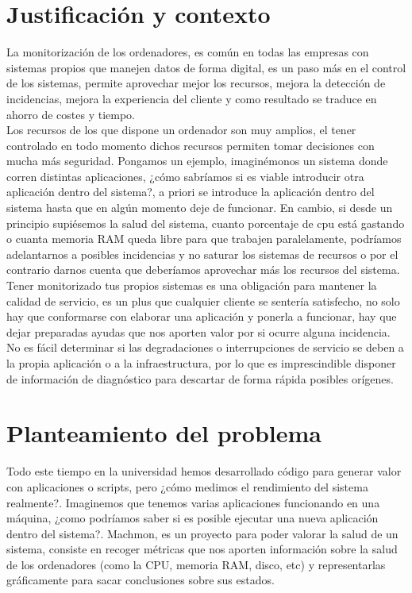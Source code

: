 \documentclass[ spanish, a4paper, 12pt, oneside]{report}
\begin{document}
\section{Justificación y contexto}


La monitorización de los ordenadores, es común en todas las empresas con sistemas propios que manejen datos de forma 
digital, es un paso más en el control de los sistemas, permite aprovechar mejor los recursos, mejora la detección de incidencias, mejora la experiencia del 
cliente y como resultado se traduce en ahorro de costes y tiempo. \\

Los recursos de los que dispone un ordenador son muy amplios, el tener controlado en todo momento dichos recursos permiten tomar decisiones
con mucha más seguridad. Pongamos un ejemplo, imaginémonos un sistema donde corren distintas aplicaciones, ¿cómo sabríamos si es viable introducir otra 
aplicación dentro del sistema?, a priori se introduce la aplicación dentro del sistema hasta que en algún momento deje de funcionar. 
En cambio, si desde un principio supiésemos la salud del sistema, cuanto porcentaje de cpu está gastando o cuanta memoria RAM queda libre para que trabajen
paralelamente, podríamos adelantarnos a posibles incidencias y no saturar los sistemas de recursos o por el contrario darnos cuenta que deberíamos 
aprovechar más los recursos del sistema.\\

Tener monitorizado tus propios sistemas es una obligación para mantener la calidad de servicio, es un plus que cualquier cliente se sentería satisfecho, no solo hay 
que conformarse con elaborar una aplicación y ponerla a funcionar, hay que dejar preparadas ayudas que nos aporten valor por si ocurre alguna incidencia. No es fácil 
determinar si las degradaciones o interrupciones de servicio se deben a la propia aplicación o a la infraestructura, por lo que es imprescindible disponer de información 
de diagnóstico para descartar de forma rápida posibles orígenes. \\

\section{Planteamiento del problema}
Todo este tiempo en la universidad hemos desarrollado código para generar valor con aplicaciones o scripts, pero ¿cómo medimos 
el rendimiento del sistema realmente?. Imaginemos que tenemos varias aplicaciones funcionando en una máquina, ¿como 
podríamos saber si es posible ejecutar una nueva aplicación dentro del sistema?. Machmon, es un proyecto para poder valorar la salud de 
un sistema, consiste en recoger métricas que nos aporten información sobre la salud de los
ordenadores (como la CPU, memoria RAM, disco, etc) y representarlas gráficamente para sacar conclusiones sobre sus estados. \\
\end{document}
